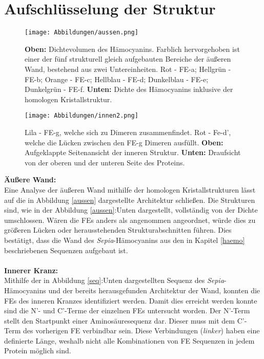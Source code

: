 \section{Aufschlüsselung der Struktur} %
\label{sec:aufschluesselung_der_struktur}
\begin{wrapfigure}{r}{0.38\textwidth}
	\centering
	\texttt{[image: Abbildungen/aussen.png]}
	\caption[Architektur der äußeren Wand]{\textbf{Oben:} Dichtevolumen des Hämocyanins. Farblich hervorgehoben ist einer der fünf strukturell gleich aufgebauten Bereiche der äußeren Wand, bestehend aus zwei Untereinheiten. Rot - FE-a; Hellgrün - FE-b; Orange - FE-c; Hellblau - FE-d; Dunkelblau - FE-e; Dunkelgrün - FE-f. \textbf{Unten:} Dichte des Hämocyanins inklusive der homologen Kristallstruktur.}
	\label{aussen}
	\centering
	\texttt{[image: Abbildungen/innen2.png]}
	\caption[Architektur des inneren Kragens]{Lila - FE-g, welche sich zu Dimeren zusammenfindet. Rot - Fe-d', welche die Lücken zwischen den FE-g Dimeren ausfüllt. \textbf{Oben:} Aufgeklappte Seitenansicht der inneren Struktur. \textbf{Unten:} Draufsicht von der oberen und der unteren Seite des Proteins.}
	\label{innen}
\end{wrapfigure}
\textbf{Äußere Wand:}\\
Eine Analyse der äußeren Wand mithilfe der homologen Kristallstrukturen lässt auf die in Abbildung \ref{aussen} dargestellte Architektur schließen.\cite{a:einstein}
Die Strukturen sind, wie in der Abbildung \ref{aussen}:Unten dargestellt, vollständig von der Dichte umschlossen.
Wären die FEs anders als angenommen angeordnet, würde dies zu größeren Lücken oder herausstehenden Strukturabschnitten führen.
Dies bestätigt, dass die Wand des \textit{Sepia}-Hämocyanins aus den in Kapitel \ref{haemo} beschriebenen Sequenzen aufgebaut ist.
\\
\\
\textbf{Innerer Kranz:}\\
Mithilfe der in Abbildung \ref{seq}:Unten dargestellten Sequenz des \textit{Sepia}-Hämocyanins und der bereits herausgefunden Architektur der Wand, konnten die FEs des inneren Kranzes identifiziert werden.
Damit dies erreicht werden konnte sind die N'- und C'-Terme der einzelnen FEs untersucht worden.
Der N'-Term stellt den Startpunkt einer Aminosäuresequenz dar.
Dieser muss mit dem C'-Term des vorherigen FE verbindbar sein.
\FloatBarrier
Diese Verbindungen (\textit{linker}) haben eine definierte Länge, weshalb nicht alle Kombinationen von FE Sequenzen in jedem Protein möglich sind.

